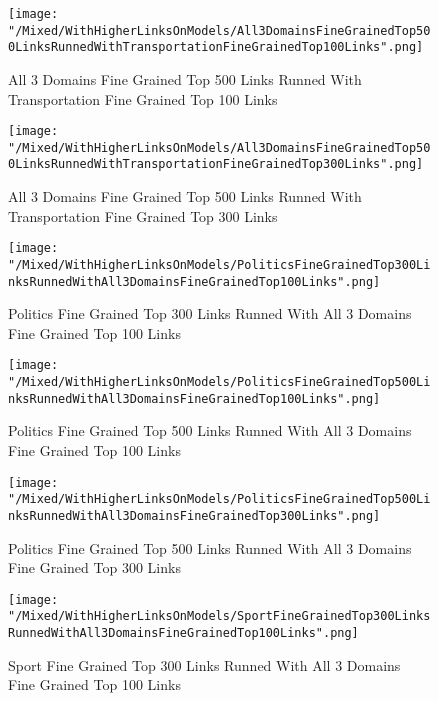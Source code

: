 \documentclass[thesis=M,english]{FITthesis}[2018/05/30]
\begin{document}
	\begin{figure}[!htb]\centering
		\texttt{[image: "/Mixed/WithHigherLinksOnModels/All3DomainsFineGrainedTop500LinksRunnedWithTransportationFineGrainedTop100Links".png]}
		\caption{All 3 Domains Fine Grained Top 500 Links Runned With Transportation Fine Grained Top 100 Links}\label{}
	\end{figure}	
	
	\begin{figure}[!htb]\centering
		\texttt{[image: "/Mixed/WithHigherLinksOnModels/All3DomainsFineGrainedTop500LinksRunnedWithTransportationFineGrainedTop300Links".png]}
		\caption{All 3 Domains Fine Grained Top 500 Links Runned With Transportation Fine Grained Top 300 Links}\label{}
	\end{figure}	
	
	\begin{figure}[!htb]\centering
		\texttt{[image: "/Mixed/WithHigherLinksOnModels/PoliticsFineGrainedTop300LinksRunnedWithAll3DomainsFineGrainedTop100Links".png]}
		\caption{Politics Fine Grained Top 300 Links Runned With All 3 Domains Fine Grained Top 100 Links}\label{}
	\end{figure}	
	
	\begin{figure}[!htb]\centering
		\texttt{[image: "/Mixed/WithHigherLinksOnModels/PoliticsFineGrainedTop500LinksRunnedWithAll3DomainsFineGrainedTop100Links".png]}
		\caption{Politics Fine Grained Top 500 Links Runned With All 3 Domains Fine Grained Top 100 Links}\label{}
	\end{figure}
	
	\begin{figure}[!htb]\centering
		\texttt{[image: "/Mixed/WithHigherLinksOnModels/PoliticsFineGrainedTop500LinksRunnedWithAll3DomainsFineGrainedTop300Links".png]}
		\caption{Politics Fine Grained Top 500 Links Runned With All 3 Domains Fine Grained Top 300 Links}\label{}
	\end{figure}
	
	\begin{figure}[!htb]\centering
		\texttt{[image: "/Mixed/WithHigherLinksOnModels/SportFineGrainedTop300LinksRunnedWithAll3DomainsFineGrainedTop100Links".png]}
		\caption{Sport Fine Grained Top 300 Links Runned With All 3 Domains Fine Grained Top 100 Links}\label{}
	\end{figure}
%	
	
\end{document}
